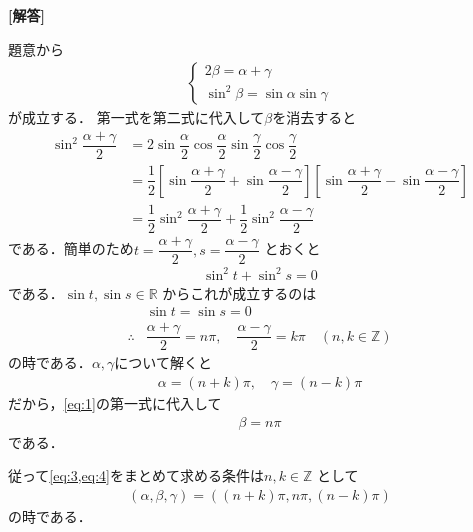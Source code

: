 \documentclass[../../main.tex]{subfiles}
\begin{document}
\begin{oframed}
  
\end{oframed}

{\bf [解答]}

題意から
\begin{align}
  \begin{cases}
    2\beta = \alpha + \gamma \\
    \sin^2\beta = \sin\alpha \sin\gamma
  \end{cases} \label{eq:1}
\end{align}
が成立する．
第一式を第二式に代入して$\beta$を消去すると
\begin{align}
  \sin^2 \dfrac{\alpha+\gamma}{2}
  &= 2\sin\dfrac{\alpha}{2}\cos\dfrac{\alpha}{2} \sin\dfrac{\gamma}{2}\cos\dfrac{\gamma}{2} \\
  &= \dfrac{1}{2} \left[ \sin\dfrac{\alpha+\gamma}{2} + \sin\dfrac{\alpha-\gamma}{2} \right] \left[ \sin\dfrac{\alpha+\gamma}{2} - \sin\dfrac{\alpha-\gamma}{2} \right] \\
  &= \dfrac{1}{2}\sin^2\dfrac{\alpha+\gamma}{2} + \dfrac{1}{2}\sin^2\dfrac{\alpha-\gamma}{2}
\end{align}
である．簡単のため$t = \dfrac{\alpha+\gamma}{2}, s = \dfrac{\alpha-\gamma}{2}$ とおくと
\begin{align}
  \sin^2 t + \sin^2 s = 0 \label{eq:2}
\end{align}
である．$\sin t, \sin s \in \mathbb{R}$ からこれが成立するのは
\begin{align}
  & \sin t = \sin s = 0 \\
  \therefore
  & \dfrac{\alpha+\gamma}{2} = n\pi, \quad \dfrac{\alpha-\gamma}{2} = k\pi \quad (n, k \in \mathbb{Z})
\end{align}
の時である．$\alpha,\gamma$について解くと
\begin{align}
  \alpha = (n+k)\pi, \quad \gamma = (n-k)\pi \label{eq:3}
\end{align}
だから，\cref{eq:1}の第一式に代入して
\begin{align}
  \beta = n\pi \label{eq:4}
\end{align}
である．

従って\cref{eq:3,eq:4}をまとめて求める条件は$n, k \in \mathbb{Z}$ として
\begin{align}
  (\alpha, \beta, \gamma) = ((n+k)\pi, n\pi, (n-k)\pi)
\end{align}
の時である．

\newpage
\end{document}
